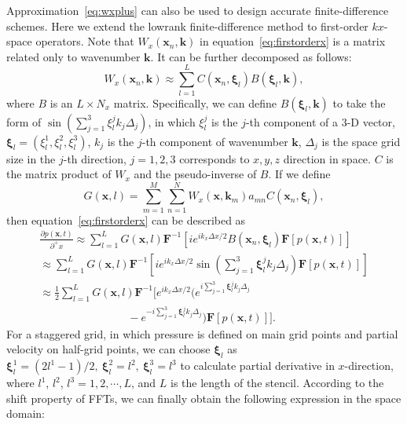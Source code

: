 Approximation~\ref{eq:wxplus} can also be used to design accurate finite-difference schemes. Here we extend the lowrank finite-difference method \cite[]{songlfd} to first-order $kx$-space operators. Note that $W_x(\mathbf{x}_n,\mathbf{k})$ in equation~\ref{eq:firstorderx} is a matrix related only to wavenumber $\mathbf{k}$. It can be further decomposed as follows:
\begin{equation}
\label{eq:w2}
\displaystyle W_x(\mathbf{x}_n,\mathbf{k}) \approx \sum\limits_{l=1}^LC(\mathbf{x}_n,\mathbf{\xi}_l)B(\mathbf{\xi}_l,\mathbf{k}), 
\end{equation}
where $B$ is an $L \times N_x$ matrix. Specifically, we can define $B(\mathbf{\xi}_l,\mathbf{k})$ to take the form of $\sin(\sum_{j=1}^3\xi_l^jk_j\Delta_j)$, in which $\xi_l^j$ is the $j$-th component of a $3$-D vector, $\mathbf{\xi}_l=(\xi_l^1,\xi_l^2,\xi_l^3)$, $k_j$ is the $j$-th component of wavenumber $\mathbf{k}$, $\Delta_j$ is the space grid size in the $j$-th direction, $j=1,2,3$ corresponds to $x,y,z$ direction in space. $C$ is the matrix product of $W_x$ and the pseudo-inverse of $B$. If we define
\begin{equation}
\label{eq:defG}
\displaystyle G(\mathbf{x},l) = \sum\limits_{m=1}^M\sum\limits_{n=1}^NW_x(\mathbf{x},\mathbf{k}_m)a_{mn}C(\mathbf{x}_n,\mathbf{\xi}_l),
\end{equation}
then equation~\ref{eq:firstorderx} can be described as 
\begin{equation}
\label{eq:fistorderxnew}
\begin{array} {l}
\displaystyle \frac{\partial p(\mathbf{x},t)}{\partial^+x} \approx \sum\limits_{l=1}^L G(\mathbf{x},l)\mathbf{F}^{-1}\left[ie^{ik_x\Delta x/2}B(\mathbf{x}_n, \mathbf{\xi}_l)\mathbf{F}\left[p(\mathbf{x},t)\right]\right]\\
 \approx \sum\limits_{l=1}^LG(\mathbf{x},l)\mathbf{F}^{-1}\left[ie^{ik_x\Delta x/2}\sin(\sum\limits_{j=1}^3\mathbf{\xi}_l^jk_j\Delta_j)\mathbf{F}\left[p(\mathbf{x},t)\right]\right] \\
 \approx \displaystyle \frac{1}{2}\sum\limits_{l=1}^LG(\mathbf{x},l)\mathbf{F}^{-1}[e^{ik_x\Delta x/2}(e^{i \sum_{j=1}^3\mathbf{\xi}_l^jk_j\Delta_j} \\
\qquad\qquad\qquad\qquad-e^{-i \sum_{j=1}^3\mathbf{\xi}_l^jk_j\Delta_j})\mathbf{F}\left[p(\mathbf{x},t)\right]] .
\end{array}
\end{equation}
For a staggered grid, in which pressure is defined on main grid points and partial velocity on half-grid points, we can choose $\mathbf{\xi}_l$ as $\mathbf{\xi}_l^1 = (2l^1-1)/2, \: \mathbf{\xi}_l^2 = l^2, \: \mathbf{\xi}_l^3 = l^3 $ to calculate partial derivative in $x$-direction, where $l^1$, $l^2$, $l^3 = 1,2,\cdots,L$, and $L$ is the length of the stencil. According to the shift property of FFTs, we can finally obtain the following expression in the space domain:
